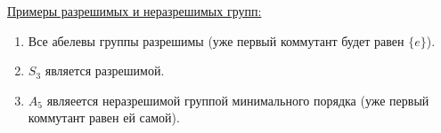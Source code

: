 \underline{Примеры разрешимых и неразрешимых групп:}
\begin{enumerate}
    \item Все абелевы группы разрешимы (уже первый коммутант будет равен $\{e\}$).
    \item $S_3$ является разрешимой.
    \item $A_5$ являеется неразрешимой группой минимального порядка (уже первый коммутант равен ей самой).
\end{enumerate}
